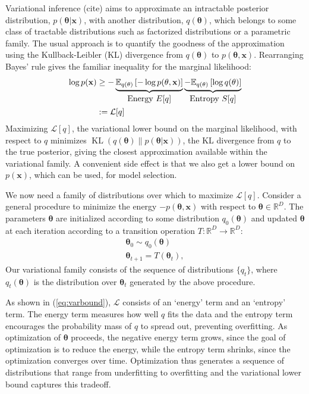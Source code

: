 \documentclass[]{article}
\newcommand{\vx}{\mathbf{x}}
\newcommand{\expectargs}[2]{\mathbb{E}_{#1} \left[ {#2} \right]}
\newcommand{\varL}{\mathcal{L}}
\DeclareMathOperator{\KLop}{KL}
\newcommand{\KL}[2]{\KLop \left(#1 \middle \| #2 \right)}
\newcommand{\data}{\vx}
\newcommand{\params}{\mathbf{\theta}}
\newcommand{\trans}{T}
\newcommand{\jointdist}{p(\params , \data)}
\newcommand{\posterior}{p(\params | \data)}
\newcommand{\reals}{\mathbb{R}}
\begin{document}
Variational inference (cite) aims to approximate an intractable posterior
distribution, $\posterior$, with another distribution, $q(\params)$,
which belongs to some class of tractable distributions such as factorized
distributions or a parametric family. The usual approach is to quantify the
goodness of the approximation using the Kullback-Leibler (KL) divergence from
$q(\params)$ to $\jointdist$. Rearranging Bayes' rule gives the familiar
inequality for the marginal likelihood:
%
\begin{align}
\log p(\data)
& \geq - \underbrace{\expectargs{q(\params)}{ -\log \jointdist }}_{\textnormal{\normalsize Energy $E[q]$}}
         \underbrace{- \expectargs{q(\params)}{\log  q(\params)}}_{\textnormal{\normalsize Entropy $S[q]$}} \nonumber \\
& := \varL[q] \label{eq:varbound}
\end{align}
%
Maximizing $\varL[q]$, the variational lower bound on the marginal likelihood,
with respect to $q$ minimizes $\KL{q(\params)}{\posterior}$, the KL
divergence from $q$ to the true posterior, giving the closest approximation
available within the variational family. A convenient side effect is that we
also get a lower bound on $p(\data)$, which can be used, for model selection.

We now need a family of distributions over which to maximize $\varL[q]$. Consider a
general procedure to minimize the energy $-\jointdist$ with respect to
$\params \in \reals^D$. The parameters $\params$ are initialized according to some
distribution $q_0(\params)$ and updated $\params$ at each iteration according to
a transition operation ${\trans : \reals^D \rightarrow \reals^D}$:
%
\begin{align}
\params_0 \sim q_0(\params) \nonumber \\
\params_{t + 1} = \trans(\params_t), \nonumber
\end{align}
%
Our variational family consists of the sequence of distributions $\{q_t\}$,
where $q_t(\params)$ is the distribution over $\params_t$ generated by the above
procedure.

As shown in (\ref{eq:varbound}), $\varL$ consists of an `energy' term and an
`entropy' term. The energy term measures how well $q$ fits the data and the
entropy term encourages the probability mass of $q$ to spread out, preventing
overfitting. As optimization of $\params$ proceeds, the negative energy term
grows, since the goal of optimization is to reduce the energy, while the entropy
term shrinks, since the optimization converges over time. Optimization thus
generates a sequence of distributions that range from underfitting to
overfitting and the variational lower bound captures this tradeoff.
\end{document}
